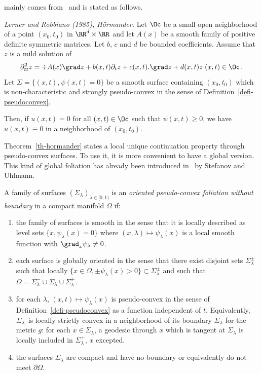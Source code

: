 \cite[Theorem~28.4.3]{Hormander} mainly comes from~\cite{LR} and is stated as follows.

\begin{theo}\label{th-hormander}
\emph{Lerner and Robbiano (1985), H\"ormander.}
Let $\Oc$ be a small open neighborhood of a point $(x_0,t_0)$ in $\RR^d\times
\RR$ and let $A(x)$ be a smooth family of positive definite symmetric matrices. Let $b$, $c$ and $d$ be bounded coefficients. Assume that $z$ is a mild solution of
\begin{equation}\label{eq-LR}
\partial^2_{tt} z=\div A(x)\grad z + b(x,t)\partial_t z+c(x,t).\grad z+d(x,t)z\;(x,t)\in\Oc\,.
\end{equation}
Let $\Sigma=\{(x,t),\psi(x,t)=0\}$ be a smooth surface containing $(x_0,t_0)$ which is non-characteristic and strongly pseudo-convex in the sense of Definition~\ref{defi-pseudoconvex}.

Then, if $u(x,t)=0$ for all $(x,t)\in\Oc$ such that $\psi(x,t)\geq 0$, we have $u(x,t)\equiv 0$ in a neighborhood of $(x_0,t_0)$.
\end{theo}

Theorem~\ref{th-hormander} states a local unique continuation property through pseudo-convex surfaces. To use it, it is more convenient to have a global version. This kind of global foliation has already been introduced in~\cite{Stefanov-Uhlmann} by Stefanov and Uhlmann.

\begin{defi}\label{defi-foliation1}
A family of surfaces $(\Sigma_\lambda)_{\lambda\in[0,1)}$ is an \emph{oriented pseudo-convex foliation without boundary} in a compact manifold $\Omega$ if:
\begin{enumerate}\romanenumi
\item \label{listdef6.4.1}the family of surfaces is smooth in the sense that it is locally described as level sets $\{x,\psi_\lambda(x)=0\}$ where $(x,\lambda)\mapsto\psi_\lambda(x)$ is a local smooth function with $\grad_x\psi_\lambda\neq 0$.
\item \label{listdef6.4.2}each surface is globally oriented in the sense that there exist disjoint sets $\Sigma_\lambda^\pm$ such that locally $\{x\in\Omega,\pm\psi_\lambda(x)> 0\}\subset \Sigma_\lambda^\pm$ and such that $\Omega=\Sigma_\lambda^- \cup
\Sigma_\lambda \cup \Sigma_\lambda^+$.
\item \label{listdef6.4.3}for each $\lambda$, $(x,t)\mapsto \psi_\lambda(x)$ is pseudo-convex in the sense of Definition~\ref{defi-pseudoconvex} as a function independent of $t$. Equivalently, $\Sigma_\lambda^-$ is locally strictly convex in a neighborhood of its boundary $\Sigma_\lambda$ for the metric $g$: for each $x\in\Sigma_\lambda$, a geodesic through $x$ which is tangent at $\Sigma_\lambda$ is locally included in $\Sigma_\lambda^+$, $x$ excepted.
\item \label{listdef6.4.4}the surfaces $\Sigma_\lambda$ are compact and have no boundary or equivalently do not meet $\partial\Omega$.
\end{enumerate}
\end{defi}

